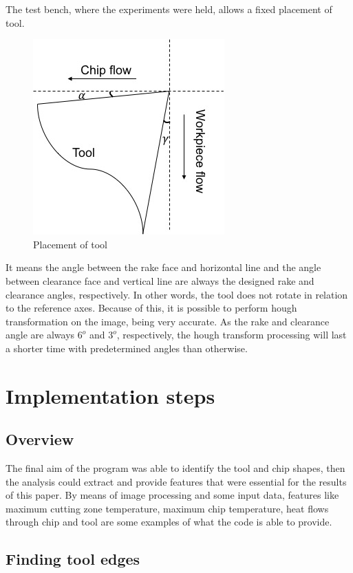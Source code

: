 	The test bench, where the experiments were held, allows a fixed placement of tool.

	\begin{figure}[H]
		\centering
		\captionsetup{justification=centering}
		\includegraphics[scale = 0.65]{Cap4/imgset.jpg}
		\caption{Placement of tool}
		\label{fig:imgset}
	\end{figure}

	It means the angle between the rake face and horizontal line and the angle between clearance face and vertical line are always the designed rake and clearance angles, respectively. In other words, the tool does not rotate in relation to the reference axes. Because of this, it is possible to perform hough transformation on the image, being very accurate. As the rake and clearance angle are always $6^{o}$ and $3^{o}$, respectively, the hough transform processing will last a shorter time with predetermined angles than otherwise.

\section{Implementation steps}
	\subsection{Overview}	

	The final aim of the program was able to identify the tool and chip shapes, then the analysis could extract and provide features that were essential for the results of this paper. By means of image processing and some input data, features like maximum cutting zone temperature, maximum chip temperature, heat flows through chip and tool are some examples of what the code is able to provide.	
	\subsection{Finding tool edges}

